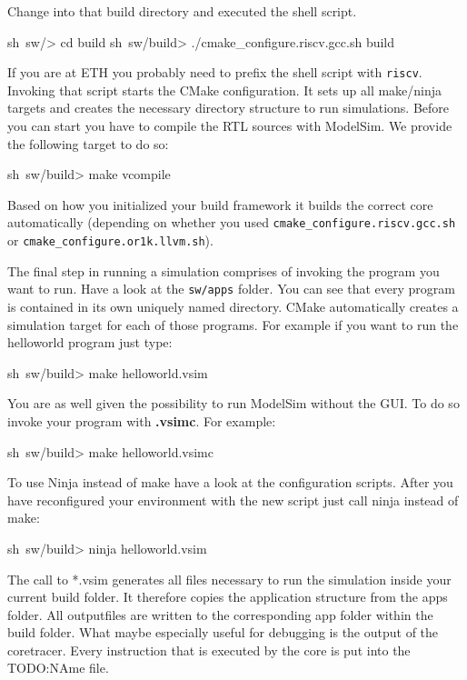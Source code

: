 Change into that build directory and executed the shell script.

\begin{shellenv}
sh~sw/> cd build
sh~sw/build> ./cmake_configure.riscv.gcc.sh build
\end{shellenv}

If you are at ETH you probably need to prefix the shell script with \verb+riscv+.
Invoking that script starts the CMake configuration. It sets up all make/ninja targets and creates the necessary directory structure to run simulations. Before you can start you have to compile the RTL sources with ModelSim. We provide the following target to do so: 

\begin{shellenv}
sh~sw/build> make vcompile
\end{shellenv}

Based on how you initialized your build framework it builds the correct core automatically (depending on whether you used \verb+cmake_configure.riscv.gcc.sh+ or \verb+cmake_configure.or1k.llvm.sh+).

The final step in running a simulation comprises of invoking the program you want to run. Have a look at the \verb+sw/apps+ folder. You can see that every program is contained in its own uniquely named directory. CMake automatically creates a simulation target for each of those programs. For example if you want to run the helloworld program just type:

\begin{shellenv}
sh~sw/build> make helloworld.vsim
\end{shellenv}

You are as well given the possibility to run ModelSim without the GUI. To do so invoke your program with \textbf{.vsimc}. For example:

\begin{shellenv}
sh~sw/build> make helloworld.vsimc
\end{shellenv}

To use Ninja instead of make have a look at the configuration scripts. After you have reconfigured your environment with the new script just call ninja instead of make:

\begin{shellenv}
sh~sw/build> ninja helloworld.vsim
\end{shellenv}

The call to *.vsim generates all files necessary to run the simulation inside your current build folder. It therefore copies the application structure from the apps folder. All outputfiles are written to the corresponding app folder within the build folder. What maybe especially useful for debugging is the output of the coretracer. Every instruction that is executed by the core is put into the TODO:NAme file.

